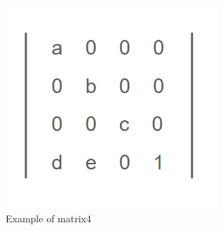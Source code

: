 \begin{figure}[t]
    \centering
    \includegraphics[width=8cm]{Images/App/matrix4.png}
    \caption{Example of matrix4}
    \label{fig:matrix4}
\end{figure}

